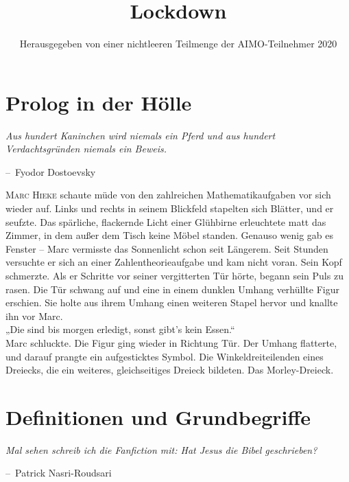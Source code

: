 \documentclass[oneside]{memoir}
\title{Lockdown}
\author{Herausgegeben von einer nichtleeren Teilmenge der AIMO-Teilnehmer 2020}
\makeatletter
\newenvironment{chapquote}[2][2em]
  {\setlength{\@tempdima}{#1}%
   \def\chapquote@author{#2}%
   \parshape 1 \@tempdima \dimexpr\textwidth-2\@tempdima\relax%
   \itshape}
  {\par\normalfont\hfill--\ \chapquote@author\hspace*{\@tempdima}\par\bigskip}
\makeatother
\begin{document}
\begin{titlingpage}
\maketitle
\end{titlingpage}
\newpage
\thispagestyle{empty}
\begin{center}
\end{center}
\setcounter{page}{2}
\chapter{Prolog in der Hölle}

\begin{chapquote}{Fyodor Dostoevsky}
\glqq Aus hundert Kaninchen wird niemals ein Pferd und aus hundert Verdachtsgründen niemals ein Beweis.\grqq
\end{chapquote}

\lettrine{M}{arc Hieke} schaute müde von den zahlreichen Mathematikaufgaben vor sich wieder auf. Links und rechts in seinem Blickfeld stapelten sich Blätter, und er seufzte. Das spärliche, flackernde Licht einer Glühbirne erleuchtete matt das Zimmer, in dem außer dem Tisch keine Möbel standen. Genauso wenig gab es Fenster -- Marc vermisste das Sonnenlicht schon seit Längerem. Seit Stunden versuchte er sich an einer Zahlentheorieaufgabe und kam nicht voran. Sein Kopf schmerzte. Als er Schritte vor seiner vergitterten Tür hörte, begann sein Puls zu rasen. Die Tür schwang auf und eine in einem dunklen Umhang verhüllte Figur erschien. Sie holte aus ihrem Umhang einen weiteren Stapel hervor und knallte ihn vor Marc. \\
„Die sind bis morgen erledigt, sonst gibt's kein Essen.“ \\
Marc schluckte. Die Figur ging wieder in Richtung Tür. Der Umhang flatterte, und darauf prangte ein aufgesticktes Symbol. Die Winkeldreiteilenden eines Dreiecks, die ein weiteres, gleichseitiges Dreieck bildeten. Das Morley-Dreieck.

\chapter{Definitionen und Grundbegriffe} %
\begin{chapquote}{Patrick Nasri-Roudsari}
\glqq Mal sehen schreib ich die Fanfiction mit: Hat Jesus die Bibel geschrieben?\grqq
\end{chapquote}
\end{document}
